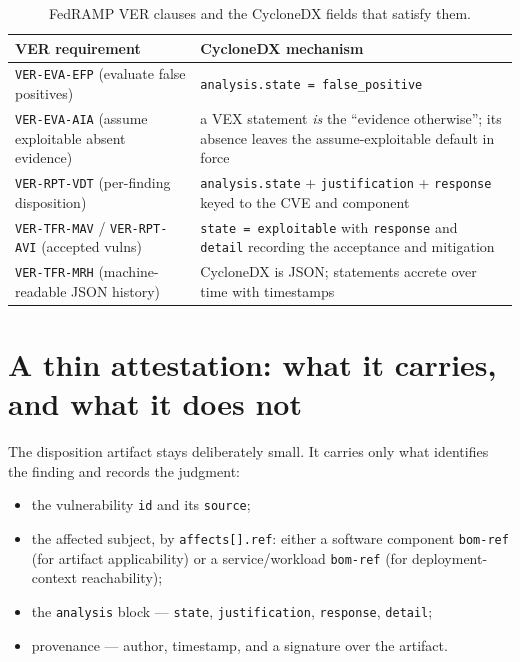 \documentclass[11pt]{article}
\newcommand{\code}[1]{\texttt{#1}}
\begin{document}
\begin{table}[H]
\centering
\footnotesize
\renewcommand{\arraystretch}{1.25}
\begin{tabular}{>{\raggedright\arraybackslash}p{} >{\raggedright\arraybackslash}p{}}
\toprule
\textbf{VER requirement} & \textbf{CycloneDX mechanism} \\
\midrule
\code{VER-EVA-EFP} (evaluate false positives) & \code{analysis.state = false\_positive} \\
\code{VER-EVA-AIA} (assume exploitable absent evidence) & a VEX statement \emph{is} the
  ``evidence otherwise''; its absence leaves the assume-exploitable default in force \\
\code{VER-RPT-VDT} (per-finding disposition) & \code{analysis.state} +
  \code{justification} + \code{response} keyed to the CVE and component \\
\code{VER-TFR-MAV} / \code{VER-RPT-AVI} (accepted vulns) & \code{state = exploitable}
  with \code{response} and \code{detail} recording the acceptance and mitigation \\
\code{VER-TFR-MRH} (machine-readable JSON history) & CycloneDX is JSON; statements
  accrete over time with timestamps \\
\bottomrule
\end{tabular}
\caption{FedRAMP VER clauses and the CycloneDX fields that satisfy them.}
\end{table}

\section{A thin attestation: what it carries, and what it does not}
The disposition artifact stays deliberately small. It carries only what identifies the
finding and records the judgment:
\begin{itemize}[leftmargin=1.5em,nosep,topsep=3pt]
\item the vulnerability \code{id} and its \code{source};
\item the affected subject, by \code{affects[].ref}: either a software component
  \code{bom-ref} (for artifact applicability) or a service/workload \code{bom-ref}
  (for deployment-context reachability);
\item the \code{analysis} block --- \code{state}, \code{justification},
  \code{response}, \code{detail};
\item provenance --- author, timestamp, and a signature over the artifact.
\end{itemize}
\end{document}
